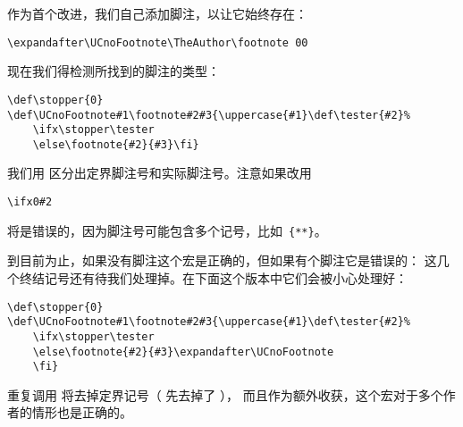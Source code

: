 \documentclass[letterpaper]{book}
\begin{document}
作为首个改进，我们自己添加脚注，以让它始终存在： 
\begin{verbatim}
\expandafter\UCnoFootnote\TheAuthor\footnote 00
\end{verbatim}
现在我们得检测所找到的脚注的类型：
\begin{verbatim}
\def\stopper{0}
\def\UCnoFootnote#1\footnote#2#3{\uppercase{#1}\def\tester{#2}%
    \ifx\stopper\tester
    \else\footnote{#2}{#3}\fi}
\end{verbatim}
我们用  区分出定界脚注号和实际脚注号。注意如果改用
\begin{verbatim}
\ifx0#2
\end{verbatim}
将是错误的，因为脚注号可能包含多个记号，比如~\verb>{**}>。

到目前为止，如果没有脚注这个宏是正确的，但如果有个脚注它是错误的：
这几个终结记号还有待我们处理掉。在下面这个版本中它们会被小心处理好：
\begin{verbatim}
\def\stopper{0}
\def\UCnoFootnote#1\footnote#2#3{\uppercase{#1}\def\tester{#2}%
    \ifx\stopper\tester
    \else\footnote{#2}{#3}\expandafter\UCnoFootnote
    \fi}
\end{verbatim}
重复调用  将去掉定界记号（ 先去掉了 ），
而且作为额外收获，这个宏对于多个作者的情形也是正确的。
\end{document}
